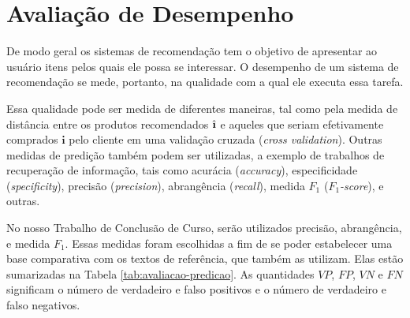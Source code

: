 \chapter{Avaliação de Desempenho} %
\label{cha:avalia_o_de_desempenho}




De modo geral os sistemas de recomendação tem o objetivo de apresentar ao usuário itens pelos quais ele possa se interessar. O desempenho de um sistema de recomendação se mede, portanto, na qualidade com a qual ele executa essa tarefa. 

Essa qualidade pode ser medida de diferentes maneiras, tal como pela medida de distância entre os produtos recomendados $\hat{\textbf{\i}}$ e aqueles que seriam efetivamente comprados $\textbf{i}$ pelo cliente em uma validação cruzada (\textit{cross validation}). Outras medidas de predição também podem ser utilizadas, a exemplo de trabalhos de recuperação de informação, tais como acurácia (\textit{accuracy}), especificidade (\textit{specificity}), precisão (\textit{precision}), abrangência (\textit{recall}), medida $F_1$ (\textit{$F_1$-score}), e outras. 

No nosso Trabalho de Conclusão de Curso, serão utilizados precisão, abrangência, e medida $F_1$. Essas medidas foram escolhidas a fim de se poder estabelecer uma base comparativa com os textos de referência, que também as utilizam. Elas estão sumarizadas na Tabela \ref{tab:avaliacao-predicao}. As quantidades $VP$, $FP$, $VN$ e $FN$ significam o número de verdadeiro e falso positivos e o número de verdadeiro e falso negativos.



